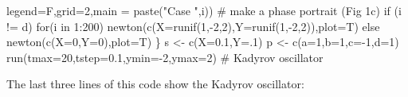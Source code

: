 \documentclass[
  a4paper,
  DIV=11,
  numbers=noendperiod]{scrreprt}
\newenvironment{Shaded}{\begin{snugshade}}{\end{snugshade}}
\newcommand{\AttributeTok}[1]{\textcolor[rgb]{0.40,0.45,0.13}{#1}}
\newcommand{\CommentTok}[1]{\textcolor[rgb]{0.37,0.37,0.37}{#1}}
\newcommand{\ControlFlowTok}[1]{\textcolor[rgb]{0.00,0.23,0.31}{#1}}
\newcommand{\DecValTok}[1]{\textcolor[rgb]{0.68,0.00,0.00}{#1}}
\newcommand{\FloatTok}[1]{\textcolor[rgb]{0.68,0.00,0.00}{#1}}
\newcommand{\FunctionTok}[1]{\textcolor[rgb]{0.28,0.35,0.67}{#1}}
\newcommand{\NormalTok}[1]{\textcolor[rgb]{0.00,0.23,0.31}{#1}}
\newcommand{\OtherTok}[1]{\textcolor[rgb]{0.00,0.23,0.31}{#1}}
\newcommand{\SpecialCharTok}[1]{\textcolor[rgb]{0.37,0.37,0.37}{#1}}
\newcommand{\StringTok}[1]{\textcolor[rgb]{0.13,0.47,0.30}{#1}}
\begin{document}
\begin{Shaded}
\begin{Highlighting}[]
        \AttributeTok{legend=}\NormalTok{F,}\AttributeTok{grid=}\DecValTok{2}\NormalTok{,}\AttributeTok{main =} \FunctionTok{paste}\NormalTok{(}\StringTok{"Case "}\NormalTok{,i)) }\CommentTok{\# make a phase portrait (Fig 1c)}
  \ControlFlowTok{if}\NormalTok{ (i }\SpecialCharTok{!=} \StringTok{\textquotesingle{}d\textquotesingle{}}\NormalTok{) }\ControlFlowTok{for}\NormalTok{(i }\ControlFlowTok{in} \DecValTok{1}\SpecialCharTok{:}\DecValTok{200}\NormalTok{) }\FunctionTok{newton}\NormalTok{(}\FunctionTok{c}\NormalTok{(}\AttributeTok{X=}\FunctionTok{runif}\NormalTok{(}\DecValTok{1}\NormalTok{,}\SpecialCharTok{{-}}\DecValTok{2}\NormalTok{,}\DecValTok{2}\NormalTok{),}\AttributeTok{Y=}\FunctionTok{runif}\NormalTok{(}\DecValTok{1}\NormalTok{,}\SpecialCharTok{{-}}\DecValTok{2}\NormalTok{,}\DecValTok{2}\NormalTok{)),}\AttributeTok{plot=}\NormalTok{T) }\ControlFlowTok{else}
    \FunctionTok{newton}\NormalTok{(}\FunctionTok{c}\NormalTok{(}\AttributeTok{X=}\DecValTok{0}\NormalTok{,}\AttributeTok{Y=}\DecValTok{0}\NormalTok{),}\AttributeTok{plot=}\NormalTok{T)}
\NormalTok{\}}
\NormalTok{s }\OtherTok{\textless{}{-}} \FunctionTok{c}\NormalTok{(}\AttributeTok{X=}\FloatTok{0.1}\NormalTok{,}\AttributeTok{Y=}\NormalTok{.}\DecValTok{1}\NormalTok{) }
\NormalTok{p }\OtherTok{\textless{}{-}} \FunctionTok{c}\NormalTok{(}\AttributeTok{a=}\DecValTok{1}\NormalTok{,}\AttributeTok{b=}\DecValTok{1}\NormalTok{,}\AttributeTok{c=}\SpecialCharTok{{-}}\DecValTok{1}\NormalTok{,}\AttributeTok{d=}\DecValTok{1}\NormalTok{)}
\FunctionTok{run}\NormalTok{(}\AttributeTok{tmax=}\DecValTok{20}\NormalTok{,}\AttributeTok{tstep=}\FloatTok{0.1}\NormalTok{,}\AttributeTok{ymin=}\SpecialCharTok{{-}}\DecValTok{2}\NormalTok{,}\AttributeTok{ymax=}\DecValTok{2}\NormalTok{) }\CommentTok{\# Kadyrov oscillator}
\end{Highlighting}
\end{Shaded}

The last three lines of this code show the Kadyrov oscillator:
\end{document}
